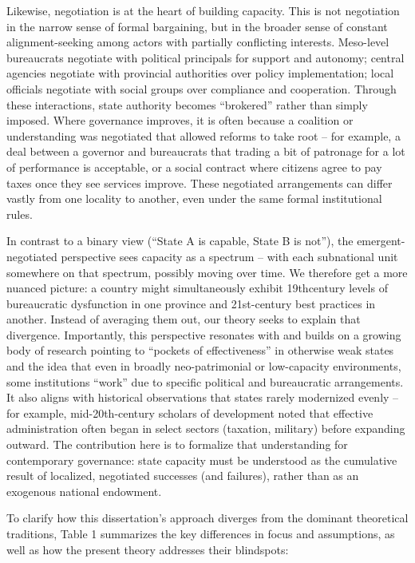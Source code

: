 Likewise, negotiation is at the heart of building capacity. This is not negotiation in the narrow sense of
formal bargaining, but in the broader sense of constant alignment-seeking among actors with partially
conflicting interests. Meso-level bureaucrats negotiate with political principals for support and
autonomy; central agencies negotiate with provincial authorities over policy implementation; local
officials negotiate with social groups over compliance and cooperation. Through these interactions, state
authority becomes “brokered” rather than simply imposed. Where governance improves, it is often
because a coalition or understanding was negotiated that allowed reforms to take root – for example, a
deal between a governor and bureaucrats that trading a bit of patronage for a lot of performance is
acceptable, or a social contract where citizens agree to pay taxes once they see services improve. These
negotiated arrangements can differ vastly from one locality to another, even under the same formal
institutional rules.

In contrast to a binary view (“State A is capable, State B is not”), the emergent-negotiated perspective
sees capacity as a spectrum – with each subnational unit somewhere on that spectrum, possibly moving
over time. We therefore get a more nuanced picture: a country might simultaneously exhibit 19thcentury
levels of bureaucratic dysfunction in one province and 21st-century best practices in another.
Instead of averaging them out, our theory seeks to explain that divergence. Importantly, this perspective
resonates with and builds on a growing body of research pointing to “pockets of effectiveness” in
otherwise weak states and the idea that even in broadly neo-patrimonial or low-capacity environments,
some institutions “work” due to specific political and bureaucratic arrangements. It also aligns with
historical observations that states rarely modernized evenly – for example, mid-20th-century scholars
of development noted that effective administration often began in select sectors (taxation, military)
before expanding outward. The contribution here is to formalize that understanding for contemporary
governance: state capacity must be understood as the cumulative result of localized, negotiated successes
(and failures), rather than as an exogenous national endowment.

To clarify how this dissertation’s approach diverges from the dominant theoretical traditions, Table 1
summarizes the key differences in focus and assumptions, as well as how the present theory addresses
their blindspots:


